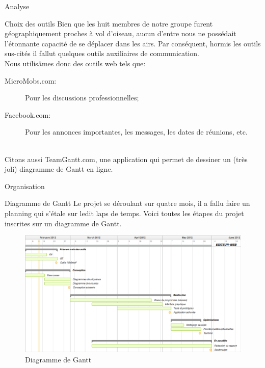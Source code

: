 \documentclass[a4paper, 12pt]{report}
\begin{document}
\begin{part}{Analyse}
\begin{chapter}{Choix des outils}
			Bien que les huit membres de notre groupe furent géographiquement proches à vol d'oiseau, aucun d'entre nous ne possédait l'étonnante
			capacité de se déplacer dans les airs. Par conséquent, hormis les outils sus-cités il fallut quelques outils auxiliaires de communication.
			\\
			Nous utilisâmes donc des outils web tels que:
			\begin{description}
				\item[MicroMobs.com:] Pour les discussions professionnelles;
				\item[Facebook.com:] Pour les annonces importantes, les messages, les dates de réunions, etc.
			\end{description}~\\

			Citons aussi TeamGantt.com, une application qui permet de dessiner un (très joli) diagramme de Gantt en ligne.
		\end{chapter}
		\begin{chapter}{Organisation}
		\begin{section}{Diagramme de Gantt}
			Le projet se déroulant sur quatre mois, il a fallu faire un planning qui s'étale sur ledit laps de temps.
			Voici toutes les étapes du projet inscrites sur un \gls{diagramme de Gantt}.
				\begin{figure}[h]
					\begin{center}
						\includegraphics[width=17cm]{images/DiagrammeGantt.png}
						\caption{Diagramme de Gantt}
					\end{center}
				\end{figure}~\\
			\end{section}
		\end{chapter}
	\end{part}
\end{document}
